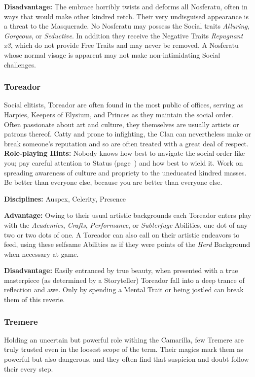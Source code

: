 \textbf{Disadvantage:}  The embrace horribly twists and deforms all Nosferatu, 
often in ways that would make other kindred retch.  Their very undisguised 
appearance is a threat to the Masquerade.  No Nosferatu may possess the Social 
traits \emph{Alluring}, \emph{Gorgeous}, or \emph{Seductive}.  In addition they 
receive the Negative Traits \emph{Repugnant x3}, which do not provide Free Traits 
and may never be removed.  A Nosferatu whose normal visage is apparent may not make 
non-intimidating Social challenges.

\subsubsection{Toreador}
Social elitists, Toreador are often found in the most public of offices, serving as 
Harpies, Keepers of Elysium, and Princes as they maintain the social order.  
Often passionate about art and culture, they themselves are usually artists or 
patrons thereof.  Catty and prone to infighting, the Clan can nevertheless make 
or break someone's reputation and so are often treated with a great deal of 
respect. \\

\textbf{Role-playing Hints:}  Nobody knows how best to navigate the social order 
like you; pay careful attention to Status (page~\pageref{sec:status}) and how best 
to wield it.  Work on spreading awareness of culture and propriety to the uneducated 
kindred masses.  Be better than everyone else, because you are better than everyone 
else.

\textbf{Disciplines:}  Auspex, Celerity, Presence

\textbf{Advantage:}  Owing to their usual artistic backgrounds each Toreador 
enters play with the \emph{Academics}, \emph{Crafts}, \emph{Performance}, or \emph{Subterfuge} 
Abilities, one dot of any two or two dots of one.  A Toreador can also call 
on their artistic endeavors to feed, using these selfsame Abilities as if they 
were points of the \emph{Herd} Background when necessary at game.

\textbf{Disadvantage:}  Easily entranced by true beauty, when presented with a true 
masterpiece (as determined by a Storyteller) Toreador fall into a deep trance of 
reflection and awe.  Only by spending a Mental Trait or being jostled can break 
them of this reverie.

\subsubsection{Tremere}
Holding an uncertain but powerful role withing the Camarilla, few Tremere are truly 
trusted even in the loosest scope of the term.  Their magics mark them as powerful 
but also dangerous, and they often find that suspicion and doubt follow their every 
step. \\

